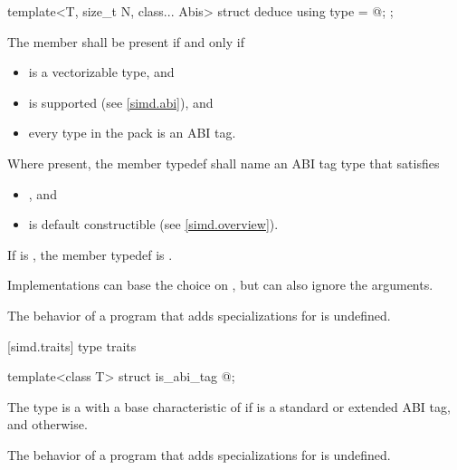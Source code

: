 \begin{itemdecl}
template<T, size_t N, class... Abis> struct deduce { using type = @\seebelow@; };
\end{itemdecl}

\begin{itemdescr}
\pnum
The member  shall be present if and only if
\begin{itemize}
  \item {} is a vectorizable type, and
  \item {} is supported (see \ref{simd.abi}), and
  \item every type in the  pack is an ABI tag.
\end{itemize}

\pnum
Where present, the member typedef  shall name an ABI tag type that satisfies
\begin{itemize}
  \item {}, and
  \item {} is default constructible (see \ref{simd.overview}).
\end{itemize}
If  is , the member typedef  is .
\begin{note}
  Implementations can base the choice on , but can also ignore the  arguments.
\end{note}

\pnum
The behavior of a program that adds specializations for  is undefined.
\end{itemdescr}

[simd.traits]{ type traits}

\begin{itemdecl}
template<class T> struct is_abi_tag { @\seebelow@ };
\end{itemdecl}

\begin{itemdescr}
\pnum
The type  is a  with a base characteristic of  if  is a standard or extended ABI tag, and  otherwise.

\pnum
The behavior of a program that adds specializations for  is undefined.
\end{itemdescr}

